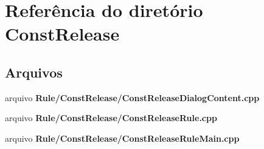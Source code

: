 \section{Referência do diretório Const\+Release}
\label{dir_49e6a0837c5fa2f49ec043924ac124d6}
\subsection*{Arquivos}
\begin{DoxyCompactItemize}
\item 
arquivo {\bf Rule/\+Const\+Release/\+Const\+Release\+Dialog\+Content.\+cpp}
\item 
arquivo {\bf Rule/\+Const\+Release/\+Const\+Release\+Rule.\+cpp}
\item 
arquivo {\bf Rule/\+Const\+Release/\+Const\+Release\+Rule\+Main.\+cpp}
\end{DoxyCompactItemize}
